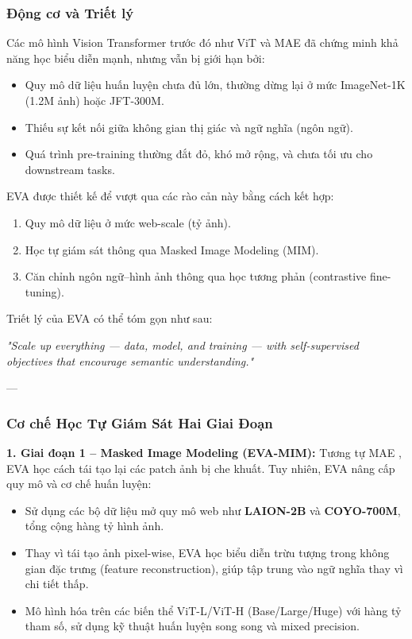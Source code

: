 \subsubsection{Động cơ và Triết lý}
Các mô hình Vision Transformer trước đó như ViT và MAE đã chứng minh khả năng học biểu diễn mạnh, nhưng vẫn bị giới hạn bởi:
\begin{itemize}
	\item Quy mô dữ liệu huấn luyện chưa đủ lớn, thường dừng lại ở mức ImageNet-1K (1.2M ảnh) hoặc JFT-300M.
	\item Thiếu sự kết nối giữa không gian thị giác và ngữ nghĩa (ngôn ngữ).
	\item Quá trình pre-training thường đắt đỏ, khó mở rộng, và chưa tối ưu cho downstream tasks.
\end{itemize}

EVA được thiết kế để vượt qua các rào cản này bằng cách kết hợp:
\begin{enumerate}
	\item Quy mô dữ liệu ở mức web-scale (tỷ ảnh).
	\item Học tự giám sát thông qua Masked Image Modeling (MIM).
	\item Căn chỉnh ngôn ngữ–hình ảnh thông qua học tương phản (contrastive fine-tuning).
\end{enumerate}

Triết lý của EVA có thể tóm gọn như sau:
\begin{center}
	\textit{"Scale up everything — data, model, and training — with self-supervised objectives that encourage semantic understanding."}
\end{center}

---

\subsubsection{Cơ chế Học Tự Giám Sát Hai Giai Đoạn}
\label{subsubsec:eva_self_supervised}

\textbf{1. Giai đoạn 1 – Masked Image Modeling (EVA-MIM):}  
Tương tự MAE \cite{He2022}, EVA học cách tái tạo lại các patch ảnh bị che khuất. Tuy nhiên, EVA nâng cấp quy mô và cơ chế huấn luyện:
\begin{itemize}
	\item Sử dụng các bộ dữ liệu mở quy mô web như \textbf{LAION-2B} và \textbf{COYO-700M}, tổng cộng hàng tỷ hình ảnh.  
	\item Thay vì tái tạo ảnh pixel-wise, EVA học biểu diễn trừu tượng trong không gian đặc trưng (feature reconstruction), giúp tập trung vào ngữ nghĩa thay vì chi tiết thấp.
	\item Mô hình hóa trên các biến thể ViT-L/ViT-H (Base/Large/Huge) với hàng tỷ tham số, sử dụng kỹ thuật huấn luyện song song và mixed precision.
\end{itemize}

